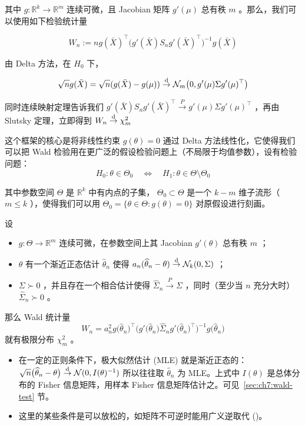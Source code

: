 其中 $g:\mathbb R^k\to\mathbb R^m$ 连续可微，且 Jacobian 矩阵 $g'(\mu)$ 总有秩 $m$ 。那么，我们可以使用如下检验统计量 

$$W_n:=ng(\bar{X})^\top\bigl(g'(\bar X)S_n g'(\bar X)^\top\bigr)^{-1}g(\bar{X})$$

由 Delta 方法，在 $H_0$ 下， 

$$\sqrt ng(\bar{X})=\sqrt n(g(\bar{X})-g(\mu))\overset{\rm d}\to \mathcal N_m\bigl(0,g'(\mu)\Sigma g'(\mu)^\top\bigr)$$

同时连续映射定理告诉我们 $g'(\bar X)S_n g'(\bar X)^\top\overset{P}\to g'(\mu)\Sigma g'(\mu)^\top$ ，再由 Slutsky 定理，立即得到 $W_n\overset{\rm d}\to \chi_m^2$

这个框架的核心是将非线性约束 $g(\theta)=0$ 通过 Delta 方法线性化，它使得我们可以把 Wald 检验用在更广泛的假设检验问题上（不局限于均值参数），设有检验问题： 
$$H_0:\theta\in\Theta_0\quad \iff\quad H_1:\theta\in\Theta\setminus\Theta_0$$

其中参数空间 $\Theta$ 是 $\mathbb R^k$ 中有内点的子集， $\Theta_0\subset \Theta$ 是一个 $k-m$ 维子流形（ $m\le k$ ），使得我们可以用 $\Theta_0=\{\theta\in\Theta:g(\theta)=0\}$ 对原假设进行刻画。
 

\begin{theorem}
\label{thm:ch5:wald-asymptotic-distribution}
设
\begin{itemize}
\tightlist
\item
  $g:\Theta\to\mathbb R^m$ 连续可微，在参数空间上其 Jacobian $g'(\theta)$ 总有秩 $m$ ；
\item
  $\theta$ 有一个渐近正态估计 $\widehat\theta_n$ 使得 $a_n(\widehat\theta_n-\theta)\overset{\rm d}\to \mathcal N_k(0,\Sigma)$ ；
\item
  $\Sigma\succ 0$ ，并且存在一个相合估计使得 $\widehat \Sigma_n\overset{P}\to \Sigma$ ，同时（至少当 $n$ 充分大时） $\widehat \Sigma_n\succ 0$ 。
\end{itemize}

那么 Wald 统计量 \[ W_n=a_n^2g\big(\widehat\theta_n\big)^\top \Big(g'\big(\widehat\theta_n\big)\widehat\Sigma_ng'\big(\widehat\theta_n\big)^\top\Big)^{-1}g\big(\widehat\theta_n\big) \]就有极限分布 $\chi_m^2$ 。

\end{theorem}

\begin{remark}

\begin{itemize}
\tightlist
\item
  在一定的正则条件下，极大似然估计 (MLE) 就是渐近正态的： $\sqrt n\big(\widehat\theta_n-\theta\big)\overset{\rm d}\to \mathcal N(0,I(\theta)^{-1})$ 所以往往取 $\widehat\theta_n$ 为 MLE。上式中 $I(\theta)$ 是总体分布的 Fisher 信息矩阵，用样本 Fisher 信息矩阵估计之。可见~\ref{sec:ch7:wald-test} 节。
\item
  这里的某些条件是可以放松的，如矩阵不可逆时能用广义逆取代 (\cite{andrews1987})。
\end{itemize}
\end{remark}

